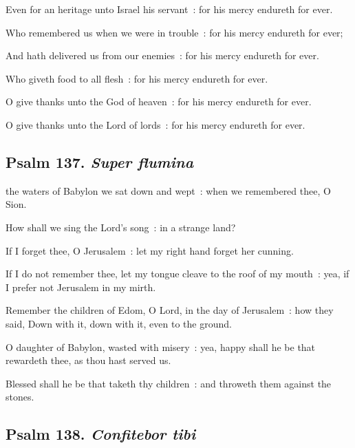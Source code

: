 Even for an heritage unto Israel his servant~: for his mercy endureth for ever.\par
{}Who remembered us when we were in trouble~: for his mercy endureth for ever;\par
{}And hath delivered us from our enemies~: for his mercy endureth for ever.\par
{}Who giveth food to all flesh~: for his mercy endureth for ever.\par
{}O give thanks unto the God of heaven~: for his mercy endureth for ever.\par
{}O give thanks unto the Lord of lords~: for his mercy endureth for ever.\par


\subsection{Psalm 137. \textit{Super flumina}}

 the waters of Babylon we sat down and wept~: when we remembered thee, O Sion.\par
{}
How shall we sing the Lord's song~: in a strange land?\par
{}If I forget thee, O Jerusalem~: let my right hand forget her cunning.\par
{}If I do not remember thee, let my tongue cleave to the roof of my mouth~: yea, if I prefer not Jerusalem in my mirth.\par
{}Remember the children of Edom, O Lord, in the day of Jerusalem~: how they said, Down with it, down with it, even to the ground.\par
{}O daughter of Babylon, wasted with misery~: yea, happy shall he be that rewardeth thee, as thou hast served us.\par
{}Blessed shall he be that taketh thy children~: and throweth them against the stones.\par


\clearpage
\subsection{Psalm 138. \textit{Confitebor tibi}}

